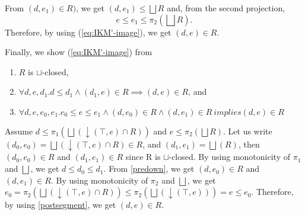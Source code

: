 \documentclass{llncs}
\newcommand{\join}{\sqcup}
\newcommand{\bigjoin}{\bigsqcup}
\begin{document}
From $(d, e_{1}) \in R)$, we get $(d , e_{1}) \leq \bigjoin R$ and, from the second projection,
\[
  e \leq e_{1} \leq \pi_{2} (\bigjoin R).
\]
Therefore, by using (\ref{eq:IKM'-image}), we get $(d, e) \in R$.

Finally, we show (\ref{eq:IKM'-image}) from
\begin{enumerate}[i]
  \item $R$ is $\join$-closed,
  \item $\forall d, e , d_{1}. d \leq d_{1} \land (d_{1} , e) \in R \implies (d , e) \in R$, and \label{predown}
  \item $\forall d, e , e_{0}, e_{1}. e_{0} \leq e \leq e_{1} \land (d , e_{0}) \in R \land (d , e_{1}) \in R \ implies (d , e) \in R$ \label{postsegment}
\end{enumerate}
Assume $d \leq \pi_{1} (\bigjoin (\downarrow (\top , e) \cap R))$ and $e \leq \pi_{2} (\bigjoin R)$.
Let us write $(d_{0} , e_{0}) = \bigjoin (\downarrow (\top , e) \cap R) \in R$, and $(d_{1} , e_{1}) = \bigjoin (R)$,
then $(d_{0}, e_{0}) \in R$ and $(d_{1}, e_{1}) \in R$ since R is $\join$-closed.
By using monotonicity of $\pi_{1}$ and $\bigjoin$, we get $d \leq d_{0} \leq d_{1}$.
From \ref{predown}, we get $(d, e_{0}) \in R$ and $(d, e_{1}) \in R$.
By using monotonicity of $\pi_{2}$ and $\bigjoin$, we get
$ e_{0} = \pi_{2} (\bigjoin (\downarrow (\top , e) \cap R)) \leq  \pi_{2} (\bigjoin (\downarrow (\top , e))) = e \leq e_{0}$.
Therefore, by using \ref{postsegment}, we get $(d, e) \in R$.
\end{document}
